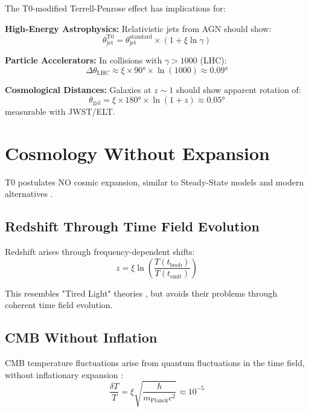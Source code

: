 	The T0-modified Terrell-Penrose effect has implications for:
	
	\textbf{High-Energy Astrophysics:}
	Relativistic jets from AGN should show:
	\begin{equation}
		\theta_{\text{jet}}^{\text{T0}} = \theta_{\text{jet}}^{\text{standard}} \times (1 + \xi \ln\gamma)
	\end{equation}
	
	\textbf{Particle Accelerators:}
	In collisions with $\gamma > 1000$ (LHC):
	\begin{equation}
		\Delta\theta_{\text{LHC}} \approx \xi \times 90° \times \ln(1000) \approx 0.09°
	\end{equation}
	
	\textbf{Cosmological Distances:}
	Galaxies at $z \sim 1$ should show apparent rotation of:
	\begin{equation}
		\theta_{\text{gal}} = \xi \times 180° \times \ln(1+z) \approx 0.05°
	\end{equation}
	measurable with JWST/ELT.
	\section{Cosmology Without Expansion}
	
	T0 postulates NO cosmic expansion, similar to Steady-State models \cite{hoyle1948, bondi1948} and modern alternatives \cite{lopez2010, lerner2014}.
	
	\subsection{Redshift Through Time Field Evolution}
	
	Redshift arises through frequency-dependent shifts:
	\begin{equation}
		z = \xi \ln\left(\frac{T(t_{\text{beob}})}{T(t_{\text{emit}})}\right)
	\end{equation}
	
	This resembles "Tired Light" theories \cite{zwicky1929}, but avoids their problems through coherent time field evolution.
	
	\subsection{CMB Without Inflation}
	
	CMB temperature fluctuations arise from quantum fluctuations in the time field, without inflationary expansion \cite{pascher2025cmb}:
	\begin{equation}
		\frac{\delta T}{T} = \xi \sqrt{\frac{\hbar}{m_{\text{Planck}}c^2}} \approx 10^{-5}
	\end{equation}
	

